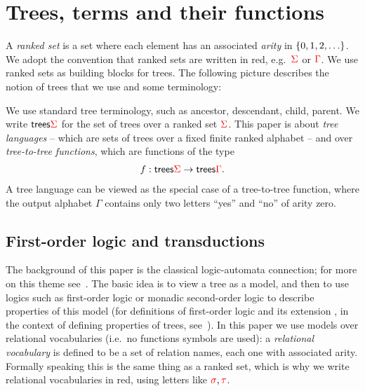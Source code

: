 \section{Trees, terms and their functions}
\label{sec:trees-transductions}
A \emph{ranked set} is a set where each element has an associated \emph{arity} in $\{0,1,2,\ldots\}$. We adopt the convention that ranked sets are written in red, e.g.~${\color{red}{\Sigma}}$ or ${\color{red}{\Gamma}}$.  We use ranked sets as building blocks for trees. The following picture describes the notion of trees that we use and some terminology:

We use standard tree terminology, such as ancestor, descendant, child, parent. We write $\mathsf {trees} {\color{red}{\Sigma}}$ for the set of trees over a ranked set ${\color{red}{\Sigma}}$. This paper is about \emph{tree languages} -- which are sets of trees over a fixed finite ranked alphabet -- and over \emph{tree-to-tree functions}, which are functions of the type \begin{align*}
f : \mathsf {trees} {\color{red}{\Sigma}} \to \mathsf {trees} {\color{red}{\Gamma}}.
\end{align*}
A tree language can be viewed as the special case of a tree-to-tree function, where the output alphabet $\Gamma$ contains only two letters ``yes'' and ``no'' of arity zero.

  
\subsection{First-order logic and transductions}
The background of this paper is the classical logic-automata connection; for more on this theme see~\cite{thomas1997languages}. The basic idea is to view a tree as a model, and then to use logics such as first-order logic  or monadic second-order logic to describe properties of this model (for definitions of first-order logic and its extension \mso, in the context of defining properties of trees, see~\cite[Section 3]{thomas1997languages}). In this paper we use models over relational vocabularies (i.e.~no functions symbols are used): a \emph{relational vocabulary} is defined to be a set of relation names, each one with associated arity. Formally speaking this is the same thing as a ranked set, which is why we write relational vocabularies in red, using letters like ${\color{red}{\sigma}}, {\color{red}{\tau}}$. 

